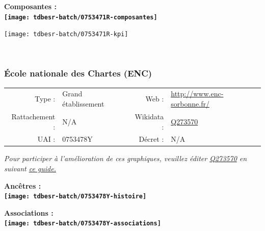 \documentclass[12pt,french,]{article}
\begin{document}
\hrulefill

\begin{center} \bf Composantes : \\  
\texttt{[image: tdbesr-batch/0753471R-composantes]} \end{center}

\begin{center}\texttt{[image: tdbesr-batch/0753471R-kpi]} \end{center}\checkoddpage

\ifoddpage \fi ~\newpage  

\hypertarget{uxe9cole-nationale-des-chartes-enc}{%
\subsubsection{École nationale des Chartes
(ENC)}\label{uxe9cole-nationale-des-chartes-enc}}

\begin{tabular*}{\textwidth}{rp{5cm}rl}  
\hline  
Type : & Grand établissement & Web : &\href{http://www.enc-sorbonne.fr/}{http://www.enc-sorbonne.fr/} \\  
Rattachement : & N/A & Wikidata : & \href{https://www.wikidata.org/entity/Q273570}{Q273570} \\  
UAI : & 0753478Y & Décret : & N/A \\  
\hline  
\end{tabular*}

\textit{\scriptsize Pour participer à l'amélioration de ces graphiques, veuillez éditer  \href{https://www.wikidata.org/entity/Q273570}{Q273570}  en suivant \href{https://github.com/cpesr/wikidataESR/blob/master/Rmd/wikidataESR.md}{ce guide.}}

\vspace{1cm}  
\begin{minipage}[b]{0.50\textwidth}\begin{center} \bf Ancêtres : \\  
\texttt{[image: tdbesr-batch/0753478Y-histoire]} \end{center}\end{minipage}\begin{minipage}[b]{0.50\textwidth}\begin{center} \bf Associations : \\  
\texttt{[image: tdbesr-batch/0753478Y-associations]} \end{center}\end{minipage}

\hrulefill
\end{document}
